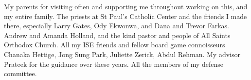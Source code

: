 My parents for visiting often and supporting me throughout working on this,
and my entire family.
The priests at St Paul's Catholic Center and the friends I made there,
especially Larry Gates, Ody Ekwonwa, and Dana and Trevor Farkas.
Andrew and Amanda Holland, and
the kind pastor and people of All Saints Orthodox Church.
All my ISE friends and fellow board game connoisseurs Chanaka Hettige, Jong Sung Park, Juliette Zerick, Abdul Rehman.
My advisor Prateek for the guidance over these years.
All the members of my defense committee.
 
